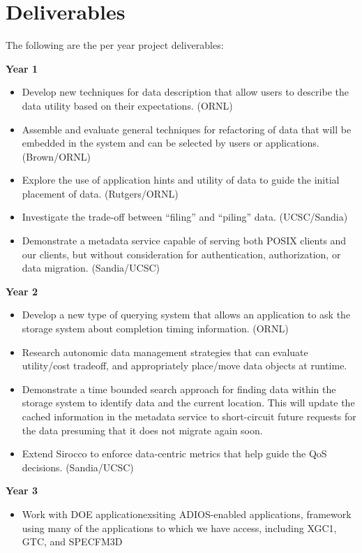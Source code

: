 \section{Deliverables}
The following are the per year project deliverables:

\textbf{Year 1}
\begin{itemize}
\item Develop new techniques for data description that allow users to 
describe the data utility based on their expectations. (ORNL)

\item Assemble and evaluate general techniques for refactoring of data
that will be embedded in the system and can be selected by users or applications. (Brown/ORNL)
\item Explore the use of application hints and utility of data to guide the initial placement of data. 
(Rutgers/ORNL)
\item Investigate the trade-off between ``filing'' and ``piling'' data. (UCSC/Sandia)
\item Demonstrate a metadata service capable of serving both POSIX clients and our clients,
but without consideration for authentication, authorization, or data migration. (Sandia/UCSC)
\end{itemize}

\textbf{Year 2}
\begin{itemize}
\item Develop a new type of querying system that allows an application to ask the storage system
about completion timing information. (ORNL)
\item Research autonomic data management strategies that
can evaluate utility/cost tradeoff, and appropriately place/move data objects at runtime.
\item Demonstrate a time bounded search approach for finding data within the storage system
to identify data and the current location. This will update the cached information in the metadata
service to short-circuit future requests for the data presuming that it does not migrate again soon. 
\item Extend Sirocco to enforce data-centric metrics that help guide the QoS decisions.
(Sandia/UCSC)
\end{itemize}

\textbf{Year 3}
\begin{itemize}
\item Work with DOE applicationexsiting ADIOS-enabled applications, framework using many of the applications to which we have access, including XGC1, GTC, and SPECFM3D
\end{itemize}
